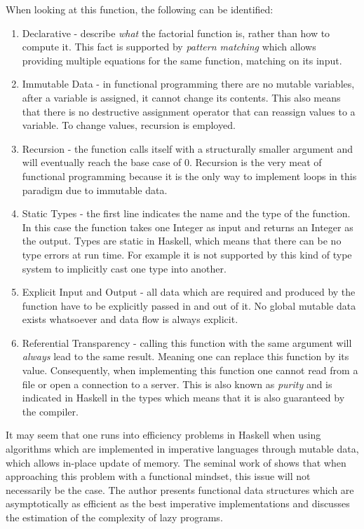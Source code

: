 When looking at this function, the following can be identified: 
\begin{enumerate}
	\item Declarative - describe \textit{what} the factorial function is, rather than how to compute it. This fact is supported by \textit{pattern matching} which allows providing multiple equations for the same function, matching on its input. 
	
	\item Immutable Data - in functional programming there are no mutable variables, after a variable is assigned, it cannot change its contents. This also means that there is no destructive assignment operator that can reassign values to a variable. To change values, recursion is employed.

	\item Recursion - the function calls itself with a structurally smaller argument and will eventually reach the base case of 0. Recursion is the very meat of functional programming because it is the only way to implement loops in this paradigm due to immutable data.
	
	\item Static Types - the first line indicates the name and the type of the function. In this case the function takes one Integer as input and returns an Integer as the output. Types are static in Haskell, which means that there can be no type errors at run time. For example it is not supported by this kind of type system to implicitly cast one type into another.

	\item Explicit Input and Output - all data which are required and produced by the function have to be explicitly passed in and out of it. No global mutable data exists whatsoever and data flow is always explicit.
	
	\item Referential Transparency - calling this function with the same argument will \textit{always} lead to the same result. Meaning one can replace this function by its value. Consequently, when implementing this function one cannot read from a file or open a connection to a server. This is also known as \textit{purity} and is indicated in Haskell in the types which means that it is also guaranteed by the compiler.
\end{enumerate}

It may seem that one runs into efficiency problems in Haskell when using algorithms which are implemented in imperative languages through mutable data, which allows in-place update of memory. The seminal work of \cite{okasaki_purely_1999} shows that when approaching this problem with a functional mindset, this issue will not necessarily be the case. The author presents functional data structures which are asymptotically as efficient as the best imperative implementations and discusses the estimation of the complexity of lazy programs.

